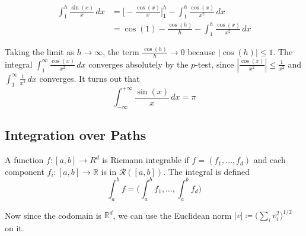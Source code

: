 \begin{example}
    \begin{align}
      \int_1^h \frac{\sin(x)}{x} \, dx & = \bigg[ -\frac{\cos(x)}{x} \bigg]_1^h - \int_1^h \frac{\cos(x)}{x^2} \, dx \\
                                       & = \cos(1) - \frac{\cos(h)}{h} - \int_1^h \frac{\cos(x)}{x^2} \, dx
    \end{align}

    Taking the limit as $h \to \infty$, the term $\frac{\cos(h)}{h} \to 0$ because $|\cos(h)| \leq 1$. The integral $\int_1^\infty \frac{\cos(x)}{x^2} \, dx$ converges absolutely by the $p$-test, since $\left| \frac{\cos(x)}{x^2} \right| \le \frac{1}{x^2}$ and $\int_1^\infty \frac{1}{x^2} \, dx$ converges. It turns out that 
    \begin{equation}
      \int_{-\infty}^{+\infty} \frac{\sin(x)}{x} \, dx = \pi
    \end{equation}
  \end{example}

\subsection{Integration over Paths}

  \begin{definition}
    \label{def:integration-for-vector-valued-functions}
    A function $f: [a, b] \to R^d$ is Riemann integrable if $f = (f_1, \ldots, f_d)$ and each component $f_i: [a, b] \to \mathbb{R}$ is in $\mathcal{R}([a, b])$. The integral is defined 
    \begin{equation}
      \int_a^b f = \bigg(\int_a^b f_1, \ldots, \int_a^b f_d \bigg)
    \end{equation}
  \end{definition}

  Now since the codomain is $\mathbb{R}^d$, we can use the Euclidean norm $|v| \coloneqq \big( \sum_i v_i^2 \big)^{1/2}$ on it. 

